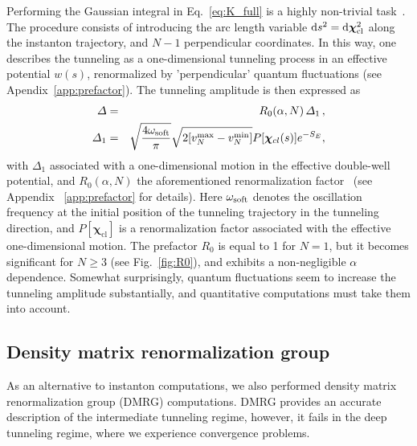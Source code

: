 \documentclass[aps, prb, floatfix, twocolumn, notitlepage, superscriptaddress, 10pt]{revtex4-2}
\newcommand{\n}{N}
\newcommand{\bchi}{\boldsymbol \chi}
\newcommand{\1}{{1\hspace*{-0.5ex} \textrm{l} \hspace*{0.5ex}}}
\begin{document}
Performing the Gaussian integral in Eq.~\eqref{eq:K_full} is a highly non-trivial task~\cite{mackenzie2000path,Milnikov.2001}. 
The procedure consists of introducing the arc length variable ${\rm d}s^2 = {\rm d}\bchi_\text{cl}^2 $
along the instanton trajectory, and $\n-1$ perpendicular coordinates. In this way, one describes the tunneling 
as a one-dimensional tunneling process in an effective potential $w(s)$, renormalized by  'perpendicular' 
quantum fluctuations (see Apendix~\ref{app:prefactor}). 
The tunneling amplitude is then expressed as
\begin{eqnarray}
\Delta &= &R_0 (\alpha, N) \, \Delta_{1}\,, 
\nonumber 
\\
\Delta_{1}& =&  \sqrt{\frac{4\omega_{\rm{soft}}}{\pi}} \sqrt{2 [v_{\n}^{\rm{max}} - v_{\n}^{\rm{min}}]} P[{\mathbold{\chi}}_{cl}(s)] e^{-S_E},
\label{eq:instanton}
\end{eqnarray}
with $\Delta_{1}$  associated with a one-dimensional motion in the effective double-well potential, 
and $R_0 (\alpha, N)$   the aforementioned renormalization factor~\cite{mackenzie2000path,Milnikov.2001} 
(see Appendix ~\ref{app:prefactor} for details). Here $\omega_{\rm{soft}}$ denotes the oscillation frequency 
at the initial position of the tunneling trajectory in the tunneling direction, and  $P\left[ \mathbold{\chi}_\text{cl}\right]$
is a renormalization factor associated with the effective one-dimensional motion. The  prefactor $R_0 $ is  equal to 1 for $N=1$, but it   becomes significant for $N\ge 3$ (see  
 Fig.~\ref{fig:R0}), and  exhibits a non-negligible $\alpha$ dependence.  Somewhat surprisingly, 
 quantum fluctuations seem to  increase the tunneling amplitude substantially, and  
 quantitative computations  must take them  into account. 


\subsection{Density matrix renormalization group}\label{sec:DMRG}
As an alternative to instanton computations, we also performed density matrix renormalization group 
(DMRG) computations.  DMRG provides an accurate description of the intermediate tunneling 
regime, however, it fails in the deep tunneling regime, where we experience convergence problems. 
\end{document}
